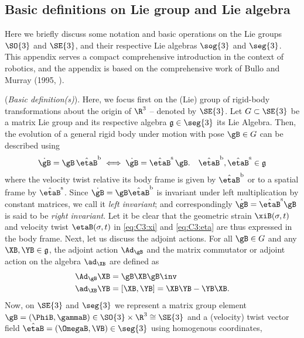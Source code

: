 \subsection{Basic definitions on Lie group and Lie algebra} 
\label{app:C3:liegroup}
Here we briefly discuss some notation and basic operations on the Lie groups $\SO{3}$ and $\SE{3}$, and their respective Lie algebras $\sog{3}$ and $\seg{3}$. This appendix serves a compact comprehensive introduction in the context of robotics, and the appendix is based on the comprehensive work of Bullo and Murray (1995, \cite{Bullo1995}).

(\textit{Basic definition(s)}). Here, we focus first on the (Lie) group of rigid-body transformations about the origin of $\R^3$ -- denoted by $\SE{3}$. Let $G \subset \SE{3}$ be a matrix Lie group and its respective algebra $\mathfrak{g} \in \seg{3}$ its Lie Algebra. Then, the evolution of a general rigid body under motion with pose $\gB \in G$ can be described using 
%
\begin{equation}
\dot{\gB} = \gB\, \hat{\etaB}^{\textrm{b}} \;  \Longleftrightarrow  \; \dot{\gB} = \hat{\etaB}^{\textrm{s}}\,\gB. \quad \hat{\etaB}^{\textrm{b}},\hat{\etaB}^{\textrm{s}} \in \mathfrak{g}
\end{equation}
%
where the velocity twist relative its body frame is given by $\hat{\etaB}^\textrm{b}$ or to a spatial frame by $\hat{\etaB}^\textrm{s}$. Since $\dot{\gB} = \gB \hat{\etaB}^{\textrm{b}}$ is invariant under left multiplication by constant matrices, we call it \textit{left invariant}; and correspondingly $\dot{\gB} = \hat{\etaB}^{\textrm{s}} \gB $ is said to be \textit{right invariant}. Let it be clear that the geometric strain $\xiB(\sigma,t)$ and velocity twist $\etaB(\sigma,t)$ in \eqref{eq:C3:xi} and \eqref{eq:C3:eta} are thus expressed in the body frame. Next, let us discuss the adjoint actions. For all $\gB \in G$ and any $\XB,\YB \in \mathfrak{g}$, the adjoint action $\Ad_{\gB}$ and the matrix commutator or adjoint action on the algebra $\ad_{\XB}$ are defined as 
%
\begin{align}
\Ad_{\gB} \XB & = \gB \XB \gB \inv \label{eq:C3:A1:adjoint1}\\
\ad_{\XB} \YB & = \left[\XB,\YB\right]  = \XB \YB - \YB\XB. \label{eq:C3:A1:adjoint2}
\end{align}
%
Now, on $\SE{3}$ and $\seg{3}$ we represent a matrix group element $\gB = (\PhiB, \gammaB) \in  \SO{3} \times \R^3 \cong \SE{3}$ and a (velocity) twist vector field $\hat{\etaB} = (\OmegaB,\VB) \in \seg{3}$ using homogenous coordinates,

